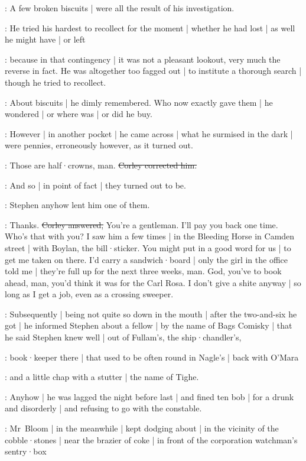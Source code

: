 :
A few broken biscuits |
were all the result of his investigation.

:
He tried his hardest to recollect for the moment |
whether he had lost |
as well he might have |
or left

:
because in that contingency |
it was not a pleasant lookout,
very much the reverse in fact.
He was altogether too fagged out |
to institute a thorough search |
though he tried to recollect.

:
About biscuits |
he dimly remembered.
Who now exactly gave them |
he wondered |
or where was |
or did he buy.

:
However |
in another pocket |
he came across |
what he surmised in the dark |
were pennies,
erroneously however,
as it turned out.

\LordJohnCorley:
Those are half·crowns,
man.
\sout{Corley corrected him.}

:
And so |
in point of fact |
they turned out to be.

:
Stephen anyhow lent him one of them.

\LordJohnCorley:
Thanks.
\sout{Corley answered,}
You're a gentleman.
I'll pay you back one time.
Who's that with you?
I saw him a few times |
in the Bleeding Horse in Camden street |
with Boylan,
the bill·sticker.
You might put in a good word for us |
to get me taken on there.
I'd carry a sandwich·board |
only the girl in the office told me |
they're full up for the next three weeks,
man.
God,
you've to book ahead,
man,
you'd think it was for the Carl Rosa.
I don't give a shite anyway |
so long as I get a job,
even as a crossing sweeper.

:
Subsequently |
being not quite so down in the mouth |
after the two-and-six he got |
he informed Stephen about a fellow |
by the name of Bags Comisky |
that he said Stephen knew well |
out of Fullam's,
the ship·chandler's,

:
book·keeper there |
that used to be often round in Nagle's |
back with O'Mara

:
and a little chap with a stutter |
the name of Tighe.

:
Anyhow |
he was lagged the night before last |
and fined ten bob |
for a drunk and disorderly |
and refusing to go with the constable.%

:
Mr~Bloom |
in the meanwhile |
kept dodging about |
in the vicinity of the cobble·stones |
near the brazier of coke |
in front of the corporation watchman's sentry·box

